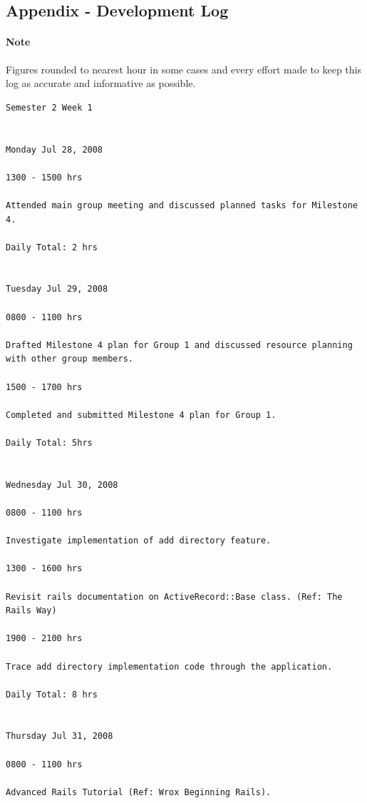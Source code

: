 \documentclass[10pt,a4,oneside]{article}
\newenvironment{mylisting}
{\begin{list}{}{\setlength{\leftmargin}{1em}}\item\scriptsize\bfseries}
{\end{list}}
\begin{document}
\paragraph{}


\newpage

\subsection*{Appendix - Development Log}

\paragraph{Note}
Figures rounded to nearest hour in some cases and every effort made 
to keep this log as accurate and informative as possible.

\begin{mylisting}
\begin{verbatim}
Semester 2 Week 1


Monday Jul 28, 2008

1300 - 1500 hrs

Attended main group meeting and discussed planned tasks for Milestone 4.

Daily Total: 2 hrs


Tuesday Jul 29, 2008

0800 - 1100 hrs

Drafted Milestone 4 plan for Group 1 and discussed resource planning with other group members.

1500 - 1700 hrs

Completed and submitted Milestone 4 plan for Group 1.

Daily Total: 5hrs


Wednesday Jul 30, 2008

0800 - 1100 hrs

Investigate implementation of add directory feature.

1300 - 1600 hrs

Revisit rails documentation on ActiveRecord::Base class. (Ref: The Rails Way)

1900 - 2100 hrs

Trace add directory implementation code through the application.

Daily Total: 8 hrs


Thursday Jul 31, 2008

0800 - 1100 hrs

Advanced Rails Tutorial (Ref: Wrox Beginning Rails).


\end{verbatim}
\end{mylisting}
\end{document}
